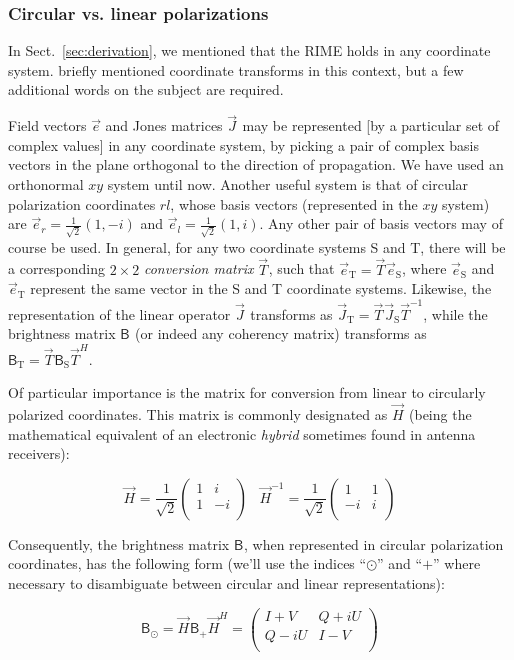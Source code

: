 \documentclass[]{aa}
\newcommand{\matrixtt}[4]{\left( \begin{array}{cc}#1&#2\\#3&#4\\\end{array} \right)}
\newcommand{\herm}{H}
\newcommand{\jones}[2]{\vec {#1}_{#2}}
\newcommand{\jonesinv}[2]{\vec {#1}^{-1}_{#2}}
\newcommand{\jonesT}[2]{\vec {#1}^{\herm}_{#2}}
\newcommand{\coh}[2]{\mathsf{{#1}}_{{#2}}}
\begin{document}
\subsubsection{\label{sec:circular}Circular vs. linear polarizations}

In Sect.~\ref{sec:derivation}, we mentioned that the RIME holds in any coordinate system. \citet{ME1} briefly mentioned coordinate transforms in this context, but a few additional words on the subject are required.

Field vectors $\vec e$ and Jones matrices $\jones{J}{}$ may be represented [by a particular set of complex values] in any coordinate system, by picking a pair of complex basis vectors in the plane orthogonal to the direction of propagation. We have used an orthonormal $xy$ system until now. Another useful system is that of circular polarization coordinates $rl$, whose basis vectors (represented in the $xy$ system) are $\vec e_r=\frac{1}{\sqrt{2}}(1,-i)$ and $\vec e_l=\frac{1}{\sqrt{2}}(1,i)$. Any other pair of basis vectors may of course be used. In general, for any two coordinate systems S and T, there will be a corresponding $2\times2$ {\em conversion matrix} $\jones{T}{}$, such that $\vec e_\mathrm{T}=\jones{T}{} \vec e_\mathrm{S}$, where $\vec e_\mathrm{S}$ and $\vec e_\mathrm{T}$ represent the same vector in the S and T coordinate systems. Likewise, the representation of the linear operator $\jones{J}{}$ transforms as $\jones{J}{\mathrm{T}}=\jones{T}{} \jones{J}{\mathrm{S}} \jonesinv{T}{}$, while the brightness matrix $\coh{B}{}$ (or indeed any coherency matrix) transforms as $\coh{B}{\mathrm{T}}=\jones{T}{} \coh{B}{\mathrm{S}} \jonesT{T}{}.$

Of particular importance is the matrix for conversion from linear to circularly polarized coordinates. This matrix is commonly designated as $\jones{H}{}$ (being the mathematical equivalent of an electronic {\em hybrid} sometimes found in antenna receivers):

\[
\jones{H}{} = \frac{1}{\sqrt{2}} \matrixtt{1}{i}{1}{-i} \;\;\; \jonesinv{H}{} = \frac{1}{\sqrt{2}} \matrixtt{1}{1}{-i}{i}
\]

Consequently, the brightness matrix $\coh{B}{}$, when represented in circular polarization coordinates, has the following form (we'll use the indices ``$\odot$'' and ``$+$'' where necessary to disambiguate between circular and linear representations):

\[
\coh{B}{\odot} = \jones{H}{} \coh{B}{+} \jonesT{H}{} = \matrixtt{I+V}{Q+iU}{Q-iU}{I-V}
\]
\end{document}
